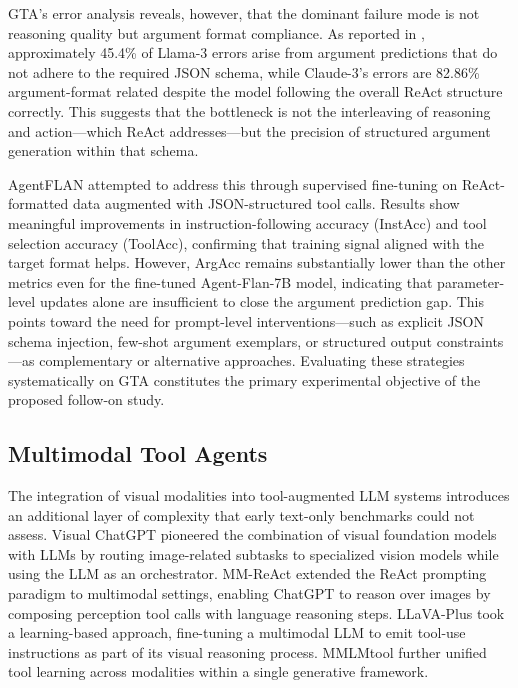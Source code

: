 \documentclass[conference]{IEEEtran}
\begin{document}
GTA's error analysis reveals, however, that the dominant failure mode is not reasoning quality but argument format compliance. As reported in \cite{wang2024gta}, approximately 45.4\% of Llama-3 errors arise from argument predictions that do not adhere to the required JSON schema, while Claude-3's errors are 82.86\% argument-format related despite the model following the overall ReAct structure correctly. This suggests that the bottleneck is not the interleaving of reasoning and action---which ReAct addresses---but the precision of structured argument generation within that schema.

AgentFLAN \cite{chen2024agentflan} attempted to address this through supervised fine-tuning on ReAct-formatted data augmented with JSON-structured tool calls. Results show meaningful improvements in instruction-following accuracy (InstAcc) and tool selection accuracy (ToolAcc), confirming that training signal aligned with the target format helps. However, ArgAcc remains substantially lower than the other metrics even for the fine-tuned Agent-Flan-7B model, indicating that parameter-level updates alone are insufficient to close the argument prediction gap. This points toward the need for prompt-level interventions---such as explicit JSON schema injection, few-shot argument exemplars, or structured output constraints---as complementary or alternative approaches. Evaluating these strategies systematically on GTA constitutes the primary experimental objective of the proposed follow-on study.

\subsection{Multimodal Tool Agents}

The integration of visual modalities into tool-augmented LLM systems introduces an additional layer of complexity that early text-only benchmarks could not assess. Visual ChatGPT \cite{wu2023visualchatgpt} pioneered the combination of visual foundation models with LLMs by routing image-related subtasks to specialized vision models while using the LLM as an orchestrator. MM-ReAct \cite{yang2023mmreact} extended the ReAct prompting paradigm to multimodal settings, enabling ChatGPT to reason over images by composing perception tool calls with language reasoning steps. LLaVA-Plus \cite{liu2023llavaplus} took a learning-based approach, fine-tuning a multimodal LLM to emit tool-use instructions as part of its visual reasoning process. MMLMtool \cite{wang2024mmlmtool} further unified tool learning across modalities within a single generative framework.
\end{document}
